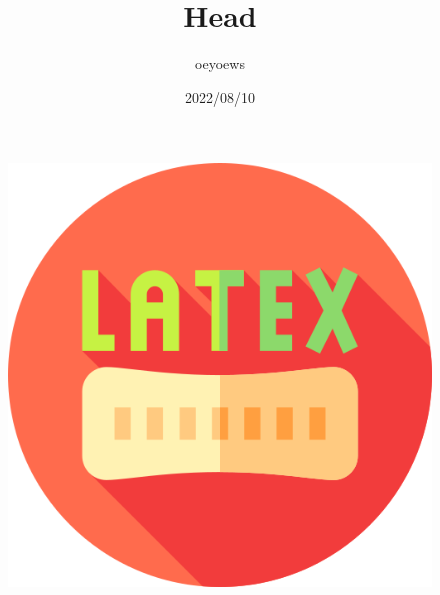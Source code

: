 \documentclass{article}
\title{Head}
\author{oeyoews}
\date{2022/08/10}
\begin{document}
\maketitle

\thispagestyle{empty}
\setcounter{page}{1}

\begin{figure}[b]
	\centering
	\includegraphics[scale=0.2]{latex}
\end{figure}
\end{document}
